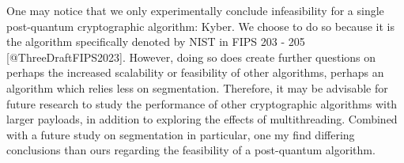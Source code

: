 \documentclass[12pt]{article}
\begin{document}
One may notice that we only experimentally conclude infeasibility for a single post-quantum cryptographic algorithm: Kyber. We choose to do so because it is the algorithm specifically denoted by NIST in FIPS 203 - 205 [@ThreeDraftFIPS2023]. However, doing so does create further questions on perhaps the increased scalability or feasibility of other algorithms, perhaps an algorithm which relies less on segmentation. Therefore, it may be advisable for future research to study the performance of other cryptographic algorithms with larger payloads, in addition to exploring the effects of multithreading. Combined with a future study on segmentation in particular, one my find differing conclusions than ours regarding the feasibility of a post-quantum algorithm. 

\printbibliography
\end{document}
